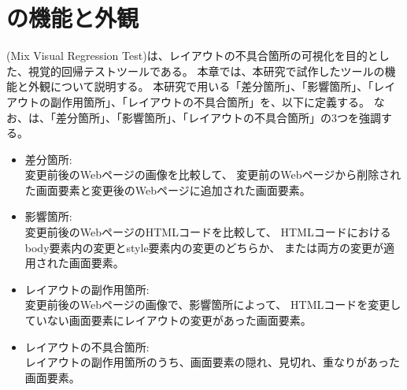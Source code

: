 \chapter{ \toolName の機能と外観}\label{cha:Function}
\toolName (Mix Visual Regression Test)は、レイアウトの不具合箇所の可視化を目的とした、視覚的回帰テストツールである。
本章では、本研究で試作したツール\toolName の機能と外観について説明する。
本研究で用いる「差分箇所」、「影響箇所」、「レイアウトの副作用箇所」、「レイアウトの不具合箇所」を、以下に定義する。
なお、\toolName は、「差分箇所」、「影響箇所」、「レイアウトの不具合箇所」の3つを強調する。
\begin{itemize}
    \item 差分箇所:\\
          変更前後のWebページの画像を比較して、
          変更前のWebページから削除された画面要素と変更後のWebページに追加された画面要素。
    \item 影響箇所:\\
          変更前後のWebページのHTMLコードを比較して、
          HTMLコードにおけるbody要素内の変更とstyle要素内の変更のどちらか、
          または両方の変更が適用された画面要素。
    \item レイアウトの副作用箇所:\\
          変更前後のWebページの画像で、影響箇所によって、
          HTMLコードを変更していない画面要素にレイアウトの変更があった画面要素。
    \item レイアウトの不具合箇所:\\
          レイアウトの副作用箇所のうち、画面要素の隠れ、見切れ、重なりがあった画面要素。
\end{itemize}

